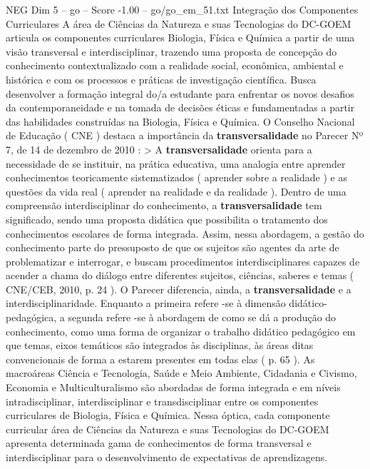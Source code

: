 \begin{textsample}{NEG Dim 5 – go – Score -1.00 – go/go\_em\_51.txt}  \label{ex:f5_neg_274}
Integração dos Componentes Curriculares A área de Ciências da Natureza e suas Tecnologias do DC-GOEM articula os componentes curriculares Biologia, Física e Química a partir de uma visão transversal e interdisciplinar, trazendo uma proposta de concepção do conhecimento contextualizado com a realidade social, econômica, ambiental e histórica e com os processos e práticas de investigação científica.
Busca desenvolver a formação integral do/a estudante para enfrentar os novos desafios da contemporaneidade e na tomada de decisões éticas e fundamentadas a partir das habilidades construídas na Biologia, Física e Química.
O Conselho Nacional de Educação ( CNE ) destaca a importância da \textbf{transversalidade} no Parecer Nº 7, de 14 de dezembro de 2010 : > A \textbf{transversalidade} orienta para a necessidade de se instituir, na prática educativa, uma analogia entre aprender conhecimentos teoricamente sistematizados ( aprender sobre a realidade ) e as questões da vida real ( aprender na realidade e da realidade ).
Dentro de uma compreensão interdisciplinar do conhecimento, a \textbf{transversalidade} tem significado, sendo uma proposta didática que possibilita o tratamento dos conhecimentos escolares de forma integrada.
Assim, nessa abordagem, a gestão do conhecimento parte do pressuposto de que os sujeitos são agentes da arte de problematizar e interrogar, e buscam procedimentos interdisciplinares capazes de acender a chama do diálogo entre diferentes sujeitos, ciências, saberes e temas ( CNE/CEB, 2010, p. 24 ).
O Parecer diferencia, ainda, a \textbf{transversalidade} e a interdisciplinaridade.
Enquanto a primeira refere -se à dimensão didático-pedagógica, a segunda refere -se à abordagem de como se dá a produção do conhecimento, como uma forma de organizar o trabalho didático pedagógico em que temas, eixos temáticos são integrados às disciplinas, às áreas ditas convencionais de forma a estarem presentes em todas elas ( p. 65 ).
As macroáreas Ciência e Tecnologia, Saúde e Meio Ambiente, Cidadania e Civismo, Economia e Multiculturalismo são abordadas de forma integrada e em níveis intradisciplinar, interdisciplinar e transdisciplinar entre os componentes curriculares de Biologia, Física e Química.
Nessa óptica, cada componente curricular área de Ciências da Natureza e suas Tecnologias do DC-GOEM apresenta determinada gama de conhecimentos de forma transversal e interdisciplinar para o desenvolvimento de expectativas de aprendizagens.

\end{textsample}
